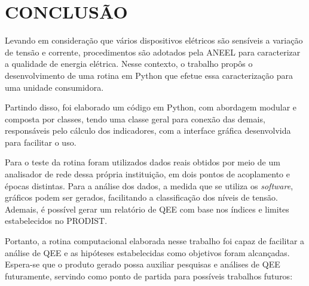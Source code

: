 \chapter{CONCLUSÃO}



Levando em consideração que vários dispositivos elétricos são sensíveis a variação de tensão e corrente, procedimentos são adotados pela ANEEL para caracterizar a qualidade de energia elétrica. Nesse contexto, o trabalho propôs o desenvolvimento de uma rotina em Python que efetue essa caracterização para uma unidade consumidora.


Partindo disso, foi elaborado um código em Python, com abordagem modular e composta por classes, tendo uma classe geral para conexão das demais, responsáveis pelo cálculo dos indicadores, com a interface gráfica desenvolvida para facilitar o uso.


Para o teste da rotina foram utilizados dados reais obtidos por meio de um analisador de rede dessa própria instituição, em dois pontos de acoplamento e épocas distintas. Para a análise dos dados, a medida que se utiliza os \textit{software}, gráficos podem ser gerados, facilitando a classificação dos níveis de tensão. Ademais, é possível gerar um relatório de QEE com base nos índices e limites estabelecidos no PRODIST.


Portanto, a rotina computacional elaborada nesse trabalho foi capaz de facilitar a análise de QEE e as hipóteses estabelecidas como objetivos foram alcançadas. Espera-se que o produto gerado possa auxiliar pesquisas e análises de QEE futuramente, servindo como ponto de partida para possíveis trabalhos futuros: 

